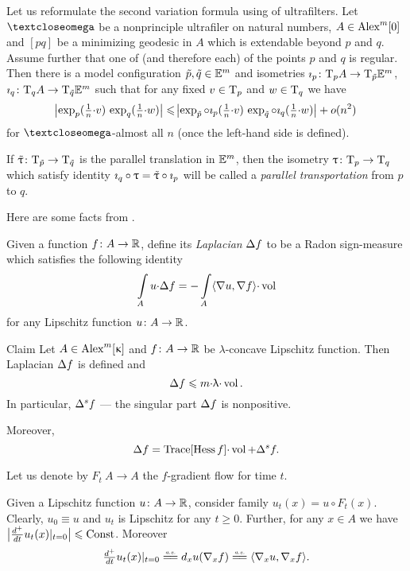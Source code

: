 \documentclass[oneside,a4paper]{article}
\begin{document}
Let us reformulate the second variation formula \cite[1.1B]{petrunin:parallel}
using of ultrafilters.
Let $\o$ be a nonprinciple ultrafiler on natural numbers,
$A\in\CBB{m}{0}$
and $[p q]$ be a minimizing geodesic in $A$ which is extendable beyond $p$ and $q$.
Assume further that one of (and therefore each) of the  points $p$ and $q$ is regular.
Then there is a model configuration $\~p,\~q\in\EE^m$ and isometries $\imath_p\:\T_p A\to\T_{\~p}\EE^m$,
$\imath_q\:\T_q A\to\T_{\~q}\EE^m$ 
such that for any fixed $v\in\T_p$ and $w\in\T_q$ we have
$$
\l|\exp_p(\tfrac 1 n{\cdot} v)\,\exp_q(\tfrac 1 n{\cdot} w)\r|
\le
\l|\exp_{\~p}\circ\imath_p(\tfrac 1 n{\cdot} v)\,\exp_{\~q}\circ\imath_q(\tfrac1 n{\cdot} w)\r|+o(n^2)$$
for $\o$-almost all $n$ (once the left-hand  side is defined).

{\sloppy If $\~\tau\:\T_{\~p}\to\T_{\~q}$ is the parallel translation in $\EE^m$, then the isometry  \hbox{$\tau\:\T_p\to\T_q$} which satisfy identity $\imath_q\circ\tau=\~\tau\circ\imath_p$ will be called a  \emph{parallel transportation} from $p$ to $q$.

}
Here are some facts from \cite{petrunin:HarmFun}.

Given a function $f\:A\to\RR$, define its \emph{Laplacian} $\Lap f$ to be a Radon sign-measure which satisfies the following identity
$$\int\limits_Au{\cdot}\Lap f
=
-\int\limits_A\<\nabla u,\nabla f\>{\cdot}\vol$$
for any Lipschitz function $u\:A\to\RR$.

\begin{thm}{Claim}\label{lap}
Let $A\in\CBB{m}{\kappa}$ and $f\:A\to \RR$ be $\lambda$-concave Lipschitz function.
Then Laplacian $\Lap f$ is defined and
$$\Lap f\le m{\cdot}\lambda{\cdot}\vol.$$
In particular, $\Lap^s f$ --- the singular part $\Lap f$ is nonpositive.

Moreover, 
$$\Lap f =\Trace[\Hess f]{\cdot}\vol+\Lap^s f.$$

\end{thm}

Let us denote by $F_t\:A\to A$ the $f$-gradient flow for time $t$.

Given a Lipschitz function $u\:A\to\RR$, 
consider family $u_t(x)=u\circ F_t(x)$.
Clearly, $u_0\equiv u$ and $u_t$ is Lipschitz for any $t\ge0$.
Further, for any $x\in A$ we have $\bigl|{\tfrac{d^+}{d t}}u_t(x)|_{t=0}\bigr|\le\Const$.
Moreover 
$$\tfrac{d^+}{d t}u_t(x)|_{t=0}\ae d_x u(\nabla_x f)\ae\<\nabla_x u,\nabla_x f\>.$$
\end{document}
